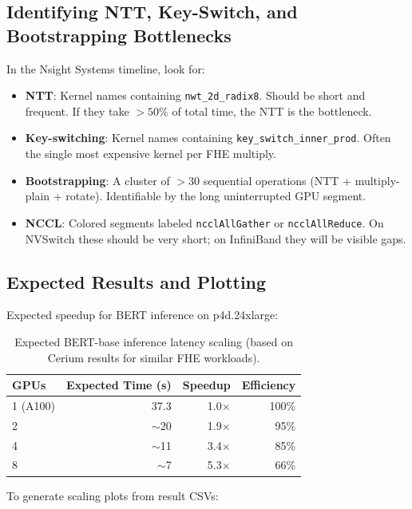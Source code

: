 \documentclass[11pt,letterpaper]{article}
\begin{document}
\subsection{Identifying NTT, Key-Switch, and Bootstrapping Bottlenecks}

In the Nsight Systems timeline, look for:

\begin{itemize}
  \item \textbf{NTT}: Kernel names containing \texttt{nwt\_2d\_radix8}. Should be
    short and frequent. If they take $>50\%$ of total time, the NTT is the bottleneck.
  \item \textbf{Key-switching}: Kernel names containing \texttt{key\_switch\_inner\_prod}.
    Often the single most expensive kernel per FHE multiply.
  \item \textbf{Bootstrapping}: A cluster of $>30$ sequential operations (NTT +
    multiply-plain + rotate). Identifiable by the long uninterrupted GPU segment.
  \item \textbf{NCCL}: Colored segments labeled \texttt{ncclAllGather} or
    \texttt{ncclAllReduce}. On NVSwitch these should be very short; on InfiniBand they
    will be visible gaps.
\end{itemize}

\subsection{Expected Results and Plotting}

Expected speedup for BERT inference on p4d.24xlarge:

\begin{table}[h]
\centering
\begin{tabular}{@{}lrrr@{}}
\toprule
\textbf{GPUs} & \textbf{Expected Time (s)} & \textbf{Speedup} & \textbf{Efficiency} \\
\midrule
1 (A100) & 37.3 & 1.0$\times$ & 100\% \\
2 & $\sim$20 & 1.9$\times$ & 95\% \\
4 & $\sim$11 & 3.4$\times$ & 85\% \\
8 & $\sim$7 & 5.3$\times$ & 66\% \\
\bottomrule
\end{tabular}
\caption{Expected BERT-base inference latency scaling (based on Cerium results for similar FHE workloads).}
\end{table}

To generate scaling plots from result CSVs:
\end{document}
